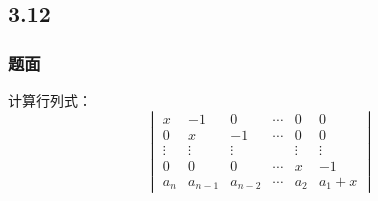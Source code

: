 \documentclass[10pt,xcolor=svgnames]{beamer} %
\begin{document}
\subsection*{3.12}
\begin{frame}
    \frametitle{题面}
    计算行列式：
    \begin{equation*}
        \begin{vmatrix}
            x      & -1      & 0       & \cdots & 0      & 0      \\
            0      & x       & -1      & \cdots & 0      & 0      \\
            \vdots & \vdots  & \vdots  &        & \vdots & \vdots \\
            0      & 0       & 0       & \cdots & x      & -1     \\
            a_n    & a_{n-1} & a_{n-2} & \cdots & a_2    & a_1+x
        \end{vmatrix}
    \end{equation*}
\end{frame}
\end{document}
